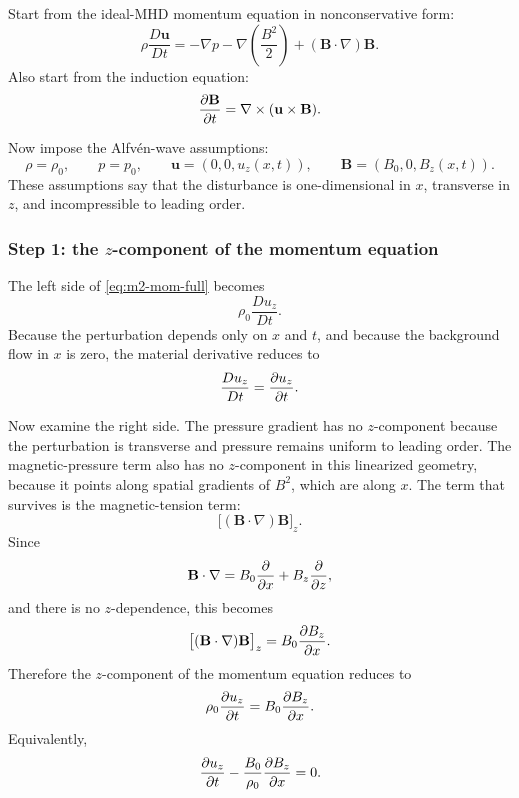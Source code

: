 \documentclass[11pt]{article}
\newcommand{\uvec}{\mathbf{u}}
\newcommand{\Bvec}{\mathbf{B}}
\begin{document}
Start from the ideal-MHD momentum equation in nonconservative form:
\begin{equation}
\rho \frac{D\uvec}{Dt}
=
-\nabla p
-\nabla\left(\frac{B^2}{2}\right)
+
(\Bvec\cdot\nabla)\Bvec.
\label{eq:m2-mom-full}
\end{equation}
Also start from the induction equation:
\begin{equation}
\pdv{\Bvec}{t}
=
\nabla\times(\uvec\times\Bvec).
\label{eq:m2-induction-full}
\end{equation}

Now impose the Alfv\'en-wave assumptions:
\begin{equation}
\rho=\rho_0, \qquad p=p_0, \qquad
\uvec=(0,0,u_z(x,t)), \qquad
\Bvec=(B_0,0,B_z(x,t)).
\label{eq:m2-alfven-assumptions}
\end{equation}
These assumptions say that the disturbance is one-dimensional in $x$, transverse in $z$, and incompressible to leading order.

\subsubsection{Step 1: the $z$-component of the momentum equation}
The left side of \eqref{eq:m2-mom-full} becomes
\begin{equation}
\rho_0 \frac{Du_z}{Dt}.
\end{equation}
Because the perturbation depends only on $x$ and $t$, and because the background flow in $x$ is zero, the material derivative reduces to
\begin{equation}
\frac{Du_z}{Dt} = \pdv{u_z}{t}.
\end{equation}

Now examine the right side. The pressure gradient has no $z$-component because the perturbation is transverse and pressure remains uniform to leading order. The magnetic-pressure term also has no $z$-component in this linearized geometry, because it points along spatial gradients of $B^2$, which are along $x$. The term that survives is the magnetic-tension term:
\begin{equation}
\bigl[(\Bvec\cdot\nabla)\Bvec\bigr]_z.
\end{equation}
Since
\begin{equation}
\Bvec\cdot\nabla = B_0\pdv{}{x} + B_z\pdv{}{z},
\end{equation}
and there is no $z$-dependence, this becomes
\begin{equation}
\bigl[(\Bvec\cdot\nabla)\Bvec\bigr]_z
=
B_0 \pdv{B_z}{x}.
\end{equation}
Therefore the $z$-component of the momentum equation reduces to
\begin{equation}
\rho_0 \pdv{u_z}{t} = B_0 \pdv{B_z}{x}.
\label{eq:m2-uz-eq1}
\end{equation}
Equivalently,
\begin{equation}
\pdv{u_z}{t} - \frac{B_0}{\rho_0}\pdv{B_z}{x}=0.
\label{eq:m2-uz-reduced}
\end{equation}
\end{document}
